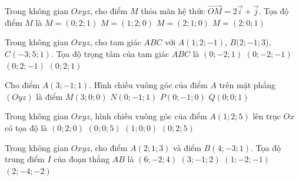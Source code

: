\begin{ex}%
	Trong không gian $Oxyz$, cho điểm $M$ thỏa mãn hệ thức $\overrightarrow{OM}=2\overrightarrow{i}+\overrightarrow{j}$. Tọa  độ điểm $M$ là
	 \choice
		 {$M=(0;2;1)$}
		 {$M=(1;2;0)$}
		{\True  $M=(2;1;0)$}
		 {$M=(2;0;1)$}
\end{ex}

\begin{ex}%
	Trong không gian $Oxyz$, cho tam giác $ABC$  với $A(1;2;-1)$, $B(2;-1;3$), $C(-3;5;1)$. Tọa độ trọng tâm của tam giác $ABC$ là
	\choice 
		{$(0;-2;1)$} 
		 {$(0;-2;-1)$}
		{$(0;2;-1)$} 
		{\True  $(0;2;1)$}
\end{ex}

\begin{ex}%
	Cho điểm  $A(3;-1;1)$. Hình chiếu vuông góc của điểm $A$ trên mặt phẳng $(Oyz)$ là điểm
	\choice 
		{$M(3;0;0)$} 
		{\True $N(0;-1;1)$} 
		 {$P(0;-1;0)$}
		{$Q(0;0;1)$} 
\end{ex}

\begin{ex}%
	Trong không gian $Oxyz$, hình chiếu vuông góc của điểm  $A(1;2;5)$ lên trục $Ox$ có tọa độ là
	 \choice
		 {$(0;2;0)$}
		 {$(0;0;5)$}
		 {\True $(1;0;0)$}
		{$(0;2;5)$} 
\end{ex}

\begin{ex}%
	Trong không  gian $Oxyz$, cho điểm $A(2;1;3)$ và điểm $B(4;-3;1)$. Tọa độ trung điểm $I$ của đoạn thẳng $AB$ là
	 \choice
		 {$(6;-2;4)$}
		 {\True $(3;-1;2)$}
		{$(1;-2;-1)$} 
		{$(2;-4;-2)$} 
\end{ex}

